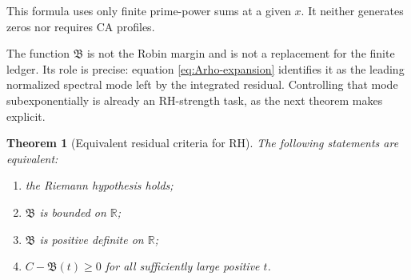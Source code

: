 \documentclass[11pt,a4paper]{article}
\numberwithin{equation}{section}
\newtheorem{theorem}{Theorem}
\theoremstyle{definition}
\newcommand{\Bres}{\mathfrak B}
\begin{document}
This formula uses only finite prime-power sums at a given \(x\).  It neither
generates zeros nor requires CA profiles.

The function \(\Bres\) is not the Robin margin and is not a replacement for
the finite ledger.  Its role is precise: equation
\eqref{eq:Arho-expansion} identifies it as the leading normalized spectral
mode left by the integrated residual.  Controlling that mode
subexponentially is already an RH-strength task, as the next theorem makes
explicit.

\begin{theorem}[Equivalent residual criteria for RH]
\label{thm:Bres-equivalences}
The following statements are equivalent:
\begin{enumerate}
  \item the Riemann hypothesis holds;
  \item \(\Bres\) is bounded on \(\mathbb R\);
  \item \(\Bres\) is positive definite on \(\mathbb R\);
  \item \(C-\Bres(t)\ge0\) for all sufficiently large positive \(t\).
\end{enumerate}
\end{theorem}
\end{document}
